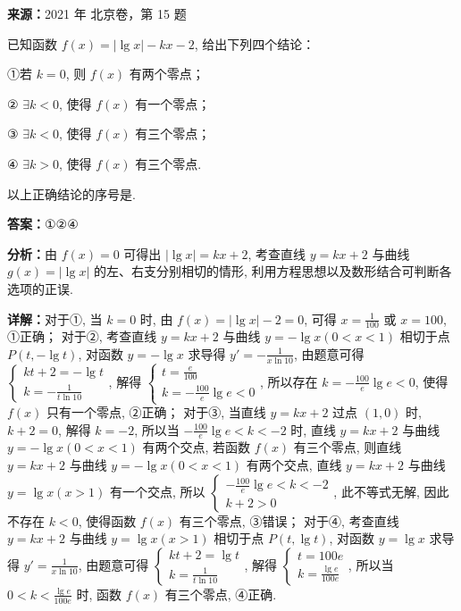 \begin{question}[points=5]
\textbf{来源：}2021 年 北京卷，第 15 题\par
已知函数 $f(x)=|\lg x|-kx-2$, 给出下列四个结论：

①若 $k=0$, 则 $f(x)$ 有两个零点；

② $\exists k<0$, 使得 $f(x)$ 有一个零点；

③ $\exists k<0$, 使得 $f(x)$ 有三个零点；

④ $\exists k>0$, 使得 $f(x)$ 有三个零点.

以上正确结论的序号是.
\fillin[{$①②④$}]
\begin{solution}
\textbf{答案：}$①②④$

\textbf{分析：}由 $f(x)=0$ 可得出 $|\lg x|=kx+2$, 考查直线 $y=kx+2$ 与曲线 $g(x)=|\lg x|$ 的左、右支分别相切的情形, 利用方程思想以及数形结合可判断各选项的正误.

\textbf{详解：}对于①, 当 $k=0$ 时, 由 $f(x)=|\lg x|-2=0$, 可得 $x=\frac{1}{100}$ 或 $x=100$, ①正确；
对于②, 考查直线 $y=kx+2$ 与曲线 $y=-\lg x(0<x<1)$ 相切于点 $P(t,-\lg t)$, 对函数 $y=-\lg x$ 求导得 $y'=-\frac{1}{x\ln 10}$, 由题意可得 $\begin{cases} kt+2=-\lg t \\ k=-\frac{1}{t\ln 10} \end{cases}$, 解得 $\begin{cases} t=\frac{e}{100} \\ k=-\frac{100}{e}\lg e<0 \end{cases}$, 所以存在 $k=-\frac{100}{e}\lg e<0$, 使得 $f(x)$ 只有一个零点, ②正确；
对于③, 当直线 $y=kx+2$ 过点 $(1,0)$ 时, $k+2=0$, 解得 $k=-2$, 所以当 $-\frac{100}{e}\lg e<k<-2$ 时, 直线 $y=kx+2$ 与曲线 $y=-\lg x(0<x<1)$ 有两个交点, 若函数 $f(x)$ 有三个零点, 则直线 $y=kx+2$ 与曲线 $y=-\lg x(0<x<1)$ 有两个交点, 直线 $y=kx+2$ 与曲线 $y=\lg x(x>1)$ 有一个交点, 所以 $\begin{cases} -\frac{100}{e}\lg e<k<-2 \\ k+2>0 \end{cases}$, 此不等式无解, 因此不存在 $k<0$, 使得函数 $f(x)$ 有三个零点, ③错误；
对于④, 考查直线 $y=kx+2$ 与曲线 $y=\lg x(x>1)$ 相切于点 $P(t,\lg t)$, 对函数 $y=\lg x$ 求导得 $y'=\frac{1}{x\ln 10}$, 由题意可得 $\begin{cases} kt+2=\lg t \\ k=\frac{1}{t\ln 10} \end{cases}$, 解得 $\begin{cases} t=100e \\ k=\frac{\lg e}{100e} \end{cases}$, 所以当 $0<k<\frac{\lg e}{100e}$ 时, 函数 $f(x)$ 有三个零点, ④正确.
\end{solution}
\end{question}

